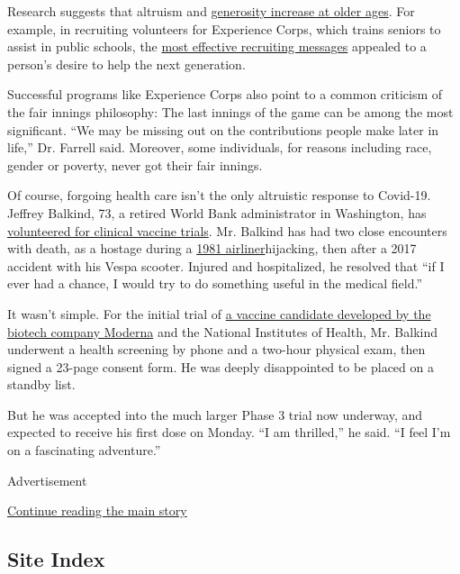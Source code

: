 Research suggests that altruism and
\href{https://academic.oup.com/psychsocgerontology/article/74/1/52/3105859}{generosity
increase at older ages}. For example, in recruiting volunteers for
Experience Corps, which trains seniors to assist in public schools, the
\href{https://ajph.aphapublications.org/doi/full/10.2105/AJPH.2009.169151}{most
effective recruiting messages} appealed to a person's desire to help the
next generation.

Successful programs like Experience Corps also point to a common
criticism of the fair innings philosophy: The last innings of the game
can be among the most significant. ``We may be missing out on the
contributions people make later in life,'' Dr. Farrell said. Moreover,
some individuals, for reasons including race, gender or poverty, never
got their fair innings.

Of course, forgoing health care isn't the only altruistic response to
Covid-19. Jeffrey Balkind, 73, a retired World Bank administrator in
Washington, has
\href{https://www.coronaviruspreventionnetwork.org/}{volunteered for
clinical vaccine trials}. Mr. Balkind has had two close encounters with
death, as a hostage during a
\href{https://www.washingtonpost.com/archive/lifestyle/1994/09/23/amateur-chronicles-crisis/0a961fb6-af41-4857-8884-5bfc0a3511fd/}{1981
airliner}hijacking, then after a 2017 accident with his Vespa scooter.
Injured and hospitalized, he resolved that ``if I ever had a chance, I
would try to do something useful in the medical field.''

It wasn't simple. For the initial trial of
\href{https://www.nytimes3xbfgragh.onion/2020/07/27/health/moderna-vaccine-covid.html}{a
vaccine candidate developed by the biotech company Moderna} and the
National Institutes of Health, Mr. Balkind underwent a health screening
by phone and a two-hour physical exam, then signed a 23-page consent
form. He was deeply disappointed to be placed on a standby list.

But he was accepted into the much larger Phase 3 trial now underway, and
expected to receive his first dose on Monday. ``I am thrilled,'' he
said. ``I feel I'm on a fascinating adventure.''

Advertisement

\protect\hyperlink{after-bottom}{Continue reading the main story}

\hypertarget{site-index}{%
\subsection{Site Index}\label{site-index}}

